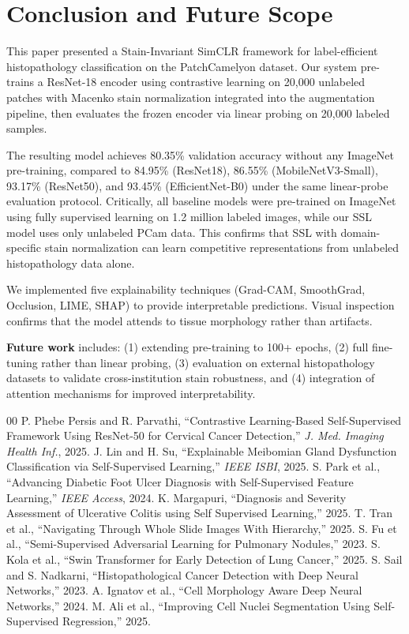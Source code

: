 \documentclass[conference]{IEEEtran}
\begin{document}
\section{Conclusion and Future Scope}
This paper presented a Stain-Invariant SimCLR framework for label-efficient histopathology classification on the PatchCamelyon dataset. Our system pre-trains a ResNet-18 encoder using contrastive learning on 20,000 unlabeled patches with Macenko stain normalization integrated into the augmentation pipeline, then evaluates the frozen encoder via linear probing on 20,000 labeled samples.

The resulting model achieves 80.35\% validation accuracy without any ImageNet pre-training, compared to 84.95\% (ResNet18), 86.55\% (MobileNetV3-Small), 93.17\% (ResNet50), and 93.45\% (EfficientNet-B0) under the same linear-probe evaluation protocol. Critically, all baseline models were pre-trained on ImageNet using fully supervised learning on 1.2 million labeled images, while our SSL model uses only unlabeled PCam data. This confirms that SSL with domain-specific stain normalization can learn competitive representations from unlabeled histopathology data alone.

We implemented five explainability techniques (Grad-CAM, SmoothGrad, Occlusion, LIME, SHAP) to provide interpretable predictions. Visual inspection confirms that the model attends to tissue morphology rather than artifacts.

\textbf{Future work} includes: (1) extending pre-training to 100+ epochs, (2) full fine-tuning rather than linear probing, (3) evaluation on external histopathology datasets to validate cross-institution stain robustness, and (4) integration of attention mechanisms for improved interpretability.

\begin{thebibliography}{00}
 P. Phebe Persis and R. Parvathi, ``Contrastive Learning-Based Self-Supervised Framework Using ResNet-50 for Cervical Cancer Detection,'' \textit{J. Med. Imaging Health Inf.}, 2025.
 J. Lin and H. Su, ``Explainable Meibomian Gland Dysfunction Classification via Self-Supervised Learning,'' \textit{IEEE ISBI}, 2025.
 S. Park et al., ``Advancing Diabetic Foot Ulcer Diagnosis with Self-Supervised Feature Learning,'' \textit{IEEE Access}, 2024.
 K. Margapuri, ``Diagnosis and Severity Assessment of Ulcerative Colitis using Self Supervised Learning,'' 2025.
 T. Tran et al., ``Navigating Through Whole Slide Images With Hierarchy,'' 2025.
 S. Fu et al., ``Semi-Supervised Adversarial Learning for Pulmonary Nodules,'' 2023.
 S. Kola et al., ``Swin Transformer for Early Detection of Lung Cancer,'' 2025.
 S. Sail and S. Nadkarni, ``Histopathological Cancer Detection with Deep Neural Networks,'' 2023.
 A. Ignatov et al., ``Cell Morphology Aware Deep Neural Networks,'' 2024.
 M. Ali et al., ``Improving Cell Nuclei Segmentation Using Self-Supervised Regression,'' 2025.
\end{thebibliography}
\end{document}

